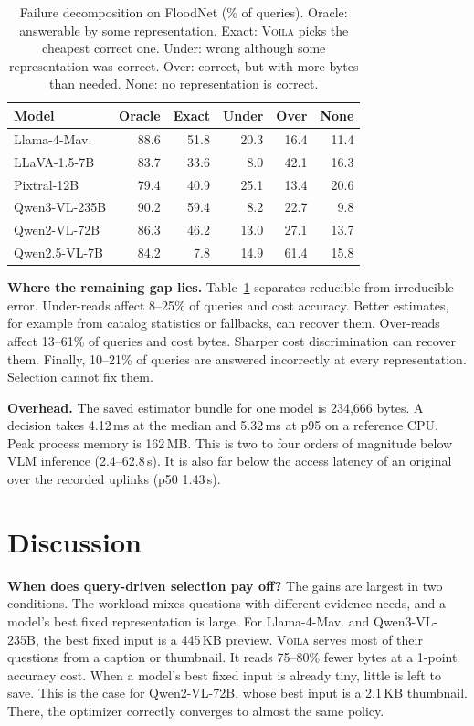 \documentclass[10pt,conference]{IEEEtran}
\newcommand{\system}{\textsc{Voila}\xspace}
\newcommand{\tableformat}{\footnotesize\setlength{\tabcolsep}{3pt}\renewcommand{\arraystretch}{0.95}}
\newcommand{\mLlama}{Llama-4-Mav.\xspace}
\newcommand{\mLlava}{LLaVA-1.5-7B\xspace}
\newcommand{\mPix}{Pixtral-12B\xspace}
\newcommand{\mQThree}{Qwen3-VL-235B\xspace}
\newcommand{\mQSevTwo}{Qwen2-VL-72B\xspace}
\newcommand{\mQSev}{Qwen2.5-VL-7B\xspace}
\begin{document}
\begin{table}[t]
\centering
\tableformat
\caption{Failure decomposition on FloodNet (\% of queries). Oracle: answerable
by some representation. Exact: \system picks the cheapest correct one. Under:
wrong although some representation was correct. Over: correct, but with more
bytes than needed. None: no representation is correct.}
\label{tab:failure}
\begin{tabular}{lrrrrr}
\toprule
Model & Oracle & Exact & Under & Over & None \\
\midrule
\mLlama   & 88.6 & 51.8 & 20.3 & 16.4 & 11.4 \\
\mLlava   & 83.7 & 33.6 & 8.0 & 42.1 & 16.3 \\
\mPix     & 79.4 & 40.9 & 25.1 & 13.4 & 20.6 \\
\mQThree  & 90.2 & 59.4 & 8.2 & 22.7 & 9.8 \\
\mQSevTwo & 86.3 & 46.2 & 13.0 & 27.1 & 13.7 \\
\mQSev    & 84.2 & 7.8 & 14.9 & 61.4 & 15.8 \\
\bottomrule
\end{tabular}
\end{table}

\textbf{Where the remaining gap lies.} Table~\ref{tab:failure} separates
reducible from irreducible error. Under-reads affect 8--25\% of queries and
cost accuracy. Better estimates, for example from catalog statistics or
fallbacks, can recover them. Over-reads affect 13--61\% of queries and cost
bytes. Sharper cost discrimination can recover them. Finally, 10--21\% of
queries are answered incorrectly at every representation. Selection cannot fix
them.

\textbf{Overhead.} The saved estimator bundle for one model is 234,666 bytes.
A decision takes 4.12\,ms at the median and 5.32\,ms at p95 on a reference
CPU. Peak process memory is 162\,MB. This is two to four orders of magnitude
below VLM inference (2.4--62.8\,s). It is also far below the access latency of
an original over the recorded uplinks (p50 1.43\,s).

\section{Discussion}
\label{sec:discussion}

\textbf{When does query-driven selection pay off?} The gains are largest in two
conditions. The workload mixes questions with different evidence needs, and a
model's best fixed representation is large. For \mLlama and \mQThree, the best
fixed input is a 445\,KB preview. \system serves most of their questions from a
caption or thumbnail. It reads 75--80\% fewer bytes at a 1-point accuracy cost.
When a model's best fixed input is already tiny, little is left to save. This
is the case for \mQSevTwo, whose best input is a 2.1\,KB thumbnail. There, the
optimizer correctly converges to almost the same policy.
\end{document}
